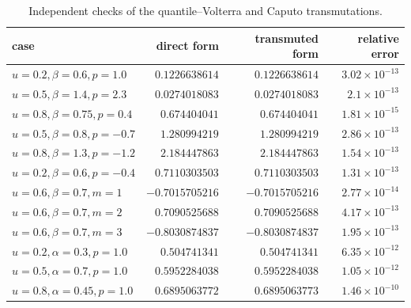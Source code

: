 \begin{table}[htbp]
\centering\small
\caption{Independent checks of the quantile--Volterra and Caputo transmutations.}
\label{tab:quantile-checks}
\begin{tabular}{@{}lrrr@{}}
\toprule
case & direct form & transmuted form & relative error\\
\midrule
$u=0.2,\beta=0.6,p=1.0$ & $0.1226638614$ & $0.1226638614$ & $3.02\mathbin{\times}10^{-13}$\\
$u=0.5,\beta=1.4,p=2.3$ & $0.0274018083$ & $0.0274018083$ & $2.1\mathbin{\times}10^{-13}$\\
$u=0.8,\beta=0.75,p=0.4$ & $0.674404041$ & $0.674404041$ & $1.81\mathbin{\times}10^{-15}$\\
$u=0.5,\beta=0.8,p=-0.7$ & $1.280994219$ & $1.280994219$ & $2.86\mathbin{\times}10^{-13}$\\
$u=0.8,\beta=1.3,p=-1.2$ & $2.184447863$ & $2.184447863$ & $1.54\mathbin{\times}10^{-13}$\\
$u=0.2,\beta=0.6,p=-0.4$ & $0.7110303503$ & $0.7110303503$ & $1.31\mathbin{\times}10^{-13}$\\
$u=0.6,\beta=0.7,m=1$ & $-0.7015705216$ & $-0.7015705216$ & $2.77\mathbin{\times}10^{-14}$\\
$u=0.6,\beta=0.7,m=2$ & $0.7090525688$ & $0.7090525688$ & $4.17\mathbin{\times}10^{-13}$\\
$u=0.6,\beta=0.7,m=3$ & $-0.8030874837$ & $-0.8030874837$ & $1.95\mathbin{\times}10^{-13}$\\
$u=0.2,\alpha=0.3,p=1.0$ & $0.504741341$ & $0.504741341$ & $6.35\mathbin{\times}10^{-12}$\\
$u=0.5,\alpha=0.7,p=1.0$ & $0.5952284038$ & $0.5952284038$ & $1.05\mathbin{\times}10^{-12}$\\
$u=0.8,\alpha=0.45,p=1.0$ & $0.6895063772$ & $0.6895063773$ & $1.46\mathbin{\times}10^{-10}$\\
\bottomrule
\end{tabular}
\end{table}

